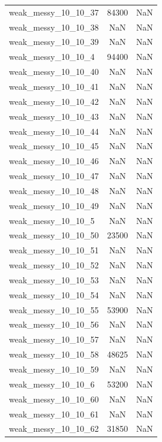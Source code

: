 \begin{longtable}{lcc}
weak\_messy\_10\_10\_37    &    84300 &    NaN \\
weak\_messy\_10\_10\_38    &      NaN &    NaN \\
weak\_messy\_10\_10\_39    &      NaN &    NaN \\
weak\_messy\_10\_10\_4     &    94400 &    NaN \\
weak\_messy\_10\_10\_40    &      NaN &    NaN \\
weak\_messy\_10\_10\_41    &      NaN &    NaN \\
weak\_messy\_10\_10\_42    &      NaN &    NaN \\
weak\_messy\_10\_10\_43    &      NaN &    NaN \\
weak\_messy\_10\_10\_44    &      NaN &    NaN \\
weak\_messy\_10\_10\_45    &      NaN &    NaN \\
weak\_messy\_10\_10\_46    &      NaN &    NaN \\
weak\_messy\_10\_10\_47    &      NaN &    NaN \\
weak\_messy\_10\_10\_48    &      NaN &    NaN \\
weak\_messy\_10\_10\_49    &      NaN &    NaN \\
weak\_messy\_10\_10\_5     &      NaN &    NaN \\
weak\_messy\_10\_10\_50    &    23500 &    NaN \\
weak\_messy\_10\_10\_51    &      NaN &    NaN \\
weak\_messy\_10\_10\_52    &      NaN &    NaN \\
weak\_messy\_10\_10\_53    &      NaN &    NaN \\
weak\_messy\_10\_10\_54    &      NaN &    NaN \\
weak\_messy\_10\_10\_55    &    53900 &    NaN \\
weak\_messy\_10\_10\_56    &      NaN &    NaN \\
weak\_messy\_10\_10\_57    &      NaN &    NaN \\
weak\_messy\_10\_10\_58    &    48625 &    NaN \\
weak\_messy\_10\_10\_59    &      NaN &    NaN \\
weak\_messy\_10\_10\_6     &    53200 &    NaN \\
weak\_messy\_10\_10\_60    &      NaN &    NaN \\
weak\_messy\_10\_10\_61    &      NaN &    NaN \\
weak\_messy\_10\_10\_62    &    31850 &    NaN \\

\end{longtable}
